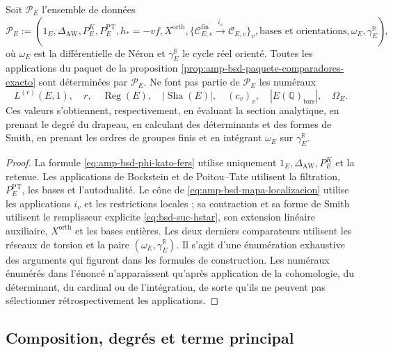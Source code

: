 \begin{lemma}
\label{lem:amp-bsd-independencia-termino-principal}
Soit \(\mathscr P_E\) l'ensemble de données
\begin{equation}\label{eq:amp-bsd-primitivas-paquete}
 \mathscr P_E:=
 \left(
  1_E,\Delta_{\mathrm{AW}},P_E^K,P_E^{\mathrm{PT}},
  h_*=-vf,X^{\mathrm{orth}},
  \{\mathcal C_{E,v}^{\mathrm{fin}}\xrightarrow{i_v}
     \mathcal C_{E,v}\}_v,
  \text{bases et orientations},
  \omega_E,\gamma_E^{\mathbb R}
 \right),
\end{equation}
où \(\omega_E\) est la différentielle de Néron et
\(\gamma_E^{\mathbb R}\) le cycle réel orienté. Toutes les applications du
paquet de la proposition
\ref{prop:amp-bsd-paquete-comparadores-exacto} sont déterminées par
\(\mathscr P_E\). Ne font pas partie de \(\mathscr P_E\) les numéraux
\[
 L^{(r)}(E,1),\quad r,\quad\operatorname{Reg}(E),\quad
 |\operatorname{Sha}(E)|,\quad(c_v)_v,\quad
 |E(\mathbb Q)_{\mathrm{tors}}|,\quad\Omega_E.
\]
Ces valeurs s'obtiennent, respectivement, en évaluant la section analytique,
en prenant le degré du drapeau, en calculant des déterminants et des formes de Smith,
en prenant les ordres de groupes finis et en intégrant
\(\omega_E\) sur \(\gamma_E^{\mathbb R}\).
\end{lemma}

\begin{proof}
La formule \eqref{eq:amp-bsd-phi-kato-fers} utilise uniquement
\(1_E,\Delta_{\mathrm{AW}},P_E^K\) et la retenue. Les applications de Bockstein et de
Poitou--Tate utilisent la filtration, \(P_E^{\mathrm{PT}}\), les bases et
l'autodualité. Le cône de \eqref{eq:amp-bsd-mapa-localizacion} utilise les
applications \(i_v\) et les restrictions locales ; sa contraction et sa forme de
Smith utilisent le remplisseur explicite \eqref{eq:bsd-suc-hstar}, son extension
linéaire auxiliaire, \(X^{\mathrm{orth}}\) et les bases entières. Les deux
derniers comparateurs utilisent les réseaux de torsion et la
paire \((\omega_E,\gamma_E^{\mathbb R})\). Il s'agit d'une énumération exhaustive
des arguments qui figurent dans les formules de construction. Les
numéraux énumérés dans l'énoncé n'apparaissent qu'après application de la
cohomologie, du déterminant, du cardinal ou de l'intégration, de sorte qu'ils ne peuvent pas
sélectionner rétrospectivement les applications.
\end{proof}

\subsection{Composition, degrés et terme principal}
\label{subsec:amp-bsd-composicion}

